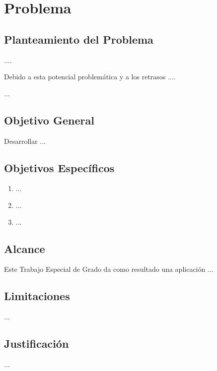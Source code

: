 \chapter{Problema}
\label{chap:problema}


\section{Planteamiento del Problema }

....

Debido a esta potencial problem\'atica y a los retrasos ....

...


\section{Objetivo General }

Desarrollar ...

\section{Objetivos Espec\'ificos }

\begin{enumerate}
	\item ...
	\item ...
	\item ...
\end{enumerate}


\section{Alcance }

Este Trabajo Especial de Grado da como resultado una aplicaci\'on ...


\section{Limitaciones }
...

\section{Justificaci\'on }

...